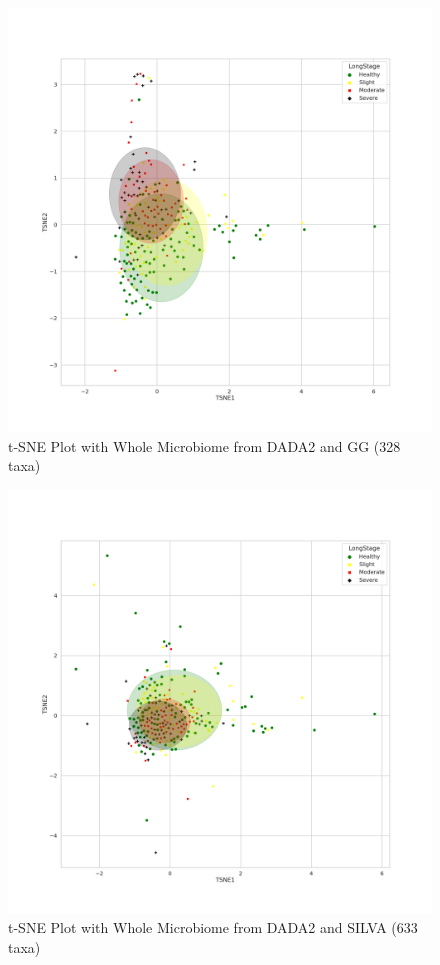 \documentclass[a4paper]{article}
\begin{document}
            \begin{figure}[p]
                \centering
                \includegraphics[width=0.6 \linewidth]{figures/tSNE/Whole/whole.DADA2.gg.png}
                \caption{t-SNE Plot with Whole Microbiome from DADA2 and GG (328 taxa)}
                \label{fig:tsne-whole-dada2-gg}
            \end{figure}

            \begin{figure}[p]
                \centering
                \includegraphics[width=0.6 \linewidth]{figures/tSNE/Whole/whole.DADA2.silva.png}
                \caption{t-SNE Plot with Whole Microbiome from DADA2 and SILVA (633 taxa)}
                \label{fig:tsne-whole-dada2-silva}
            \end{figure}
\end{document}
